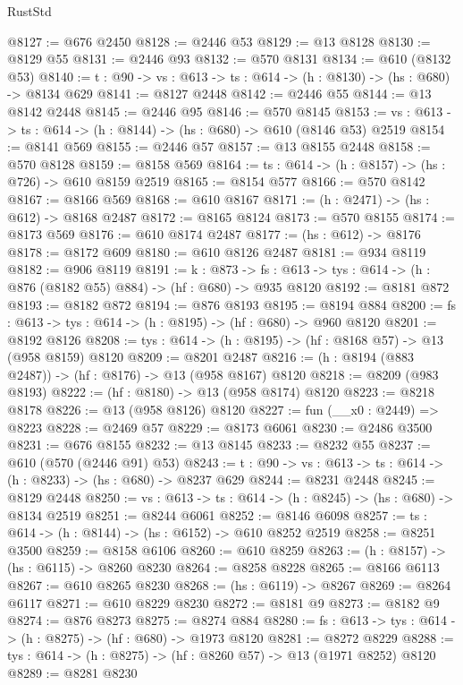 \begin{lexlean}{RustStd}
\begin{coremodule}
@8127 := @676 @2450
@8128 := @2446 @53
@8129 := @13 @8128
@8130 := @8129 @55
@8131 := @2446 @93
@8132 := @570 @8131
@8134 := @610 (@8132 @53)
@8140 := {t : @90} -> {vs : @613} -> {ts : @614} -> (h : @8130) -> (hs : @680) -> @8134 @629
@8141 := @8127 @2448
@8142 := @2446 @55
@8144 := @13 @8142 @2448
@8145 := @2446 @95
@8146 := @570 @8145
@8153 := {vs : @613} -> {ts : @614} -> (h : @8144) -> (hs : @680) -> @610 (@8146 @53) @2519
@8154 := @8141 @569
@8155 := @2446 @57
@8157 := @13 @8155 @2448
@8158 := @570 @8128
@8159 := @8158 @569
@8164 := {ts : @614} -> (h : @8157) -> (hs : @726) -> @610 @8159 @2519
@8165 := @8154 @577
@8166 := @570 @8142
@8167 := @8166 @569
@8168 := @610 @8167
@8171 := (h : @2471) -> (hs : @612) -> @8168 @2487
@8172 := @8165 @8124
@8173 := @570 @8155
@8174 := @8173 @569
@8176 := @610 @8174 @2487
@8177 := (hs : @612) -> @8176
@8178 := @8172 @609
@8180 := @610 @8126 @2487
@8181 := @934 @8119
@8182 := @906 @8119
@8191 := {k : @873} ->
  {fs : @613} -> {tys : @614} -> (h : @876 (@8182 @55) @884) -> (hf : @680) -> @935 @8120
@8192 := @8181 @872
@8193 := @8182 @872
@8194 := @876 @8193
@8195 := @8194 @884
@8200 := {fs : @613} -> {tys : @614} -> (h : @8195) -> (hf : @680) -> @960 @8120
@8201 := @8192 @8126
@8208 := {tys : @614} -> (h : @8195) -> (hf : @8168 @57) -> @13 (@958 @8159) @8120
@8209 := @8201 @2487
@8216 := (h : @8194 (@883 @2487)) -> (hf : @8176) -> @13 (@958 @8167) @8120
@8218 := @8209 (@983 @8193)
@8222 := (hf : @8180) -> @13 (@958 @8174) @8120
@8223 := @8218 @8178
@8226 := @13 (@958 @8126) @8120
@8227 := fun (__x0 : @2449) => @8223
@8228 := @2469 @57
@8229 := @8173 @6061
@8230 := @2486 @3500
@8231 := @676 @8155
@8232 := @13 @8145
@8233 := @8232 @55
@8237 := @610 (@570 (@2446 @91) @53)
@8243 := {t : @90} -> {vs : @613} -> {ts : @614} -> (h : @8233) -> (hs : @680) -> @8237 @629
@8244 := @8231 @2448
@8245 := @8129 @2448
@8250 := {vs : @613} -> {ts : @614} -> (h : @8245) -> (hs : @680) -> @8134 @2519
@8251 := @8244 @6061
@8252 := @8146 @6098
@8257 := {ts : @614} -> (h : @8144) -> (hs : @6152) -> @610 @8252 @2519
@8258 := @8251 @3500
@8259 := @8158 @6106
@8260 := @610 @8259
@8263 := (h : @8157) -> (hs : @6115) -> @8260 @8230
@8264 := @8258 @8228
@8265 := @8166 @6113
@8267 := @610 @8265 @8230
@8268 := (hs : @6119) -> @8267
@8269 := @8264 @6117
@8271 := @610 @8229 @8230
@8272 := @8181 @9
@8273 := @8182 @9
@8274 := @876 @8273
@8275 := @8274 @884
@8280 := {fs : @613} -> {tys : @614} -> (h : @8275) -> (hf : @680) -> @1973 @8120
@8281 := @8272 @8229
@8288 := {tys : @614} -> (h : @8275) -> (hf : @8260 @57) -> @13 (@1971 @8252) @8120
@8289 := @8281 @8230

\end{coremodule}
\end{lexlean}

